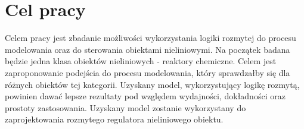 \newpage %
\section{Cel pracy}
Celem pracy jest zbadanie możliwości wykorzystania logiki rozmytej do procesu modelowania oraz do sterowania obiektami nieliniowymi. Na początek badana będzie jedna klasa obiektów nieliniowych - reaktory chemiczne. Celem jest zaproponowanie podejścia do procesu modelowania, który sprawdzałby się dla różnych obiektów tej kategorii. Uzyskany model, wykorzystujący logikę rozmytą, powinien dawać lepsze rezultaty pod względem wydajności, dokładności oraz prostoty zastosowania. Uzyskany model zostanie wykorzystany do zaprojektowania rozmytego regulatora nieliniowego obiektu.

